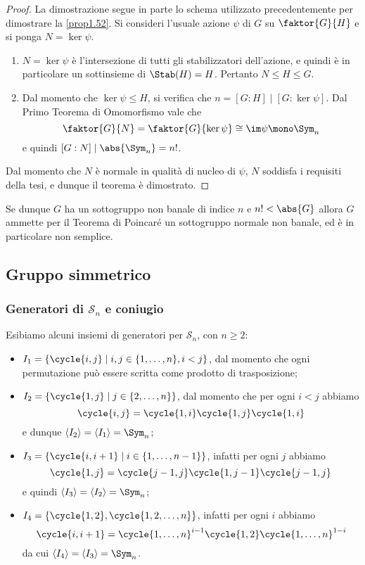 \documentclass[11pt]{scrartcl}
\begin{document}
	\begin{proof}
		La dimostrazione segue in parte lo schema utilizzato precedentemente per
		dimostrare la \autoref{prop1.52}.
		Si consideri l'usuale azione $\psi$ di $G$ su $\faktor{G}{H}$ e si
		ponga $N = \ker \psi$.
		\begin{enumerate}[(1)]
			\item $N = \ker \psi$ è l'intersezione di tutti gli stabilizzatori dell'azione,
			e quindi è in particolare un sottinsieme di $\Stab(H) = H$. Pertanto
			$N \leqslant H \leqslant G$.
			\item Dal momento che $\ker\psi \leqslant H$, si verifica che $n = [G:H] \mid [G:\ker\psi]$. Dal Primo Teorema di Omomorfismo vale che
			\[ \faktor{G}{N} = \faktor{G}{\ker\psi} \cong \im \psi \mono \Sym_n \]
			e quindi $[G : N] \mid \abs{\Sym_n} = n!$.
		\end{enumerate}
		Dal momento che $N$ è normale in qualità di nucleo di $\psi$, $N$ soddisfa i
		requisiti della tesi, e dunque il teorema è dimostrato.
	\end{proof}
	
	\begin{remark}
		Se dunque $G$ ha un sottogruppo non banale di indice $n$ e $n! < \abs{G}$
		allora $G$ ammette per il Teorema di Poincaré un sottogruppo normale non banale, ed è in particolare non semplice.
	\end{remark}
	
	\newpage
	
	\subsection{Gruppo simmetrico}
	
	\subsubsection{Generatori di $\mathcal{S}_n$ e coniugio}
	
	Esibiamo alcuni insiemi di generatori per $\mathcal{S}_n$, con $n \geq 2$:
	
	\begin{itemize}
		\item $I_1 = \{\cycle{i, j} \mid i, j \in\{1, \ldots, n\}, i < j\}$, dal momento che
		ogni permutazione può essere scritta come prodotto di trasposizione;
		\item $I_2 = \{\cycle{1, j}\mid j \in \{2, \ldots, n\}\}$, dal momento che per ogni $i<j$ abbiamo
		\[
		\cycle{i, j} = \cycle{1, i}\cycle{1, j}\cycle{1, i}
		\]
		e dunque $\langle I_2 \rangle = \langle I_1 \rangle = \Sym_n$;
		\item $I_3 = \{\cycle{i, i + 1}\mid i \in\{1, \ldots, n - 1\}\}$,
		infatti per ogni $j$ abbiamo 
		\[
		\cycle{1, j} = \cycle{j - 1, j}\cycle{1, j - 1}\cycle{j - 1, j}
		\]
		e quindi $\langle I_3 \rangle = \langle I_2 \rangle = \Sym_n$;
		\item $I_4 = \{\cycle{1, 2}, \cycle{1, 2, \ldots, n}\}$, infatti per ogni
		$i$ abbiamo 
		\[
		\cycle{i, i + 1} = \cycle{1, \ldots, n}^{i - 1}\cycle{1, 2}\cycle{1, \ldots, n}^{1 - i}
		\]
		da cui $\langle I_4 \rangle = \langle I_3 \rangle = \Sym_n$.
	\end{itemize}
	
\end{document}
